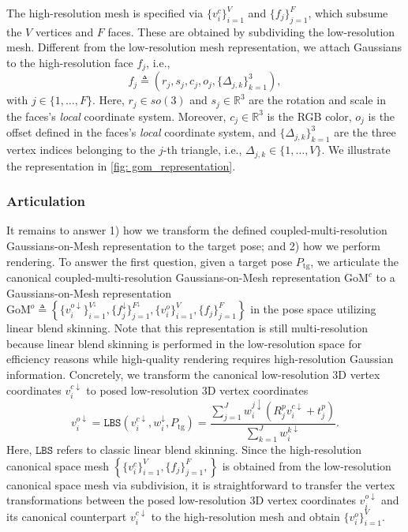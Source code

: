 The high-resolution mesh is specified via $\{v_{i}^c\}_{i=1}^{V}$ and $\{f_{j}\}_{j=1}^{F}$, which subsume the $V$ vertices and $F$ faces. %
These are obtained by subdividing the low-resolution mesh. Different from the low-resolution mesh representation, we attach  Gaussians to the high-resolution face $f_j$, i.e.,
\begin{equation}
    f_j \triangleq (r_j, s_j, c_j, o_j, \{\Delta_{j,k}\}_{k=1}^3), \label{eq: face}
\end{equation}
with $j\in\{1, \dots, F\}$. Here, $r_j \in so(3)$ and $s_j \in \mathbb{R}^3$ are the rotation and scale in the faces's \textit{local} coordinate system. Moreover, $c_j \in \mathbb{R}^3$ is the RGB color, $o_j$ is the offset defined in the faces's \textit{local} coordinate system, and $\{\Delta_{j,k}\}_{k=1}^3$ are the three vertex indices belonging to the $j$-th triangle, i.e., $\Delta_{j,k} \in \{1, \dots, V\}$. We illustrate the representation in \cref{fig: gom_representation}.


\subsubsection{Articulation}
\label{sec: articulation}
It remains to answer 1) how we transform the defined coupled-multi-resolution Gaussians-on-Mesh representation to the target pose; and 2) how we perform rendering. To answer the first question, 
given a target pose $P_\text{tg}$, we articulate the canonical coupled-multi-resolution Gaussians-on-Mesh representation $\text{GoM}^c$ to a  Gaussians-on-Mesh representation $\text{GoM}^o \triangleq \left\{\{v_{i}^{o\downarrow}\}_{i=1}^{V^\downarrow}, \{f_{j}^\downarrow\}_{j=1}^{F^\downarrow}, \{v_{i}^o\}_{i=1}^V, \{f_{j}\}_{j=1}^{F}\right\}$ in the pose space utilizing linear blend skinning. Note that this representation is still multi-resolution because linear blend skinning is performed in the low-resolution space for efficiency reasons while high-quality rendering requires high-resolution Gaussian information. Concretely, we transform the canonical low-resolution 3D vertex coordinates $v_i^{c\downarrow}$ to posed low-resolution 3D vertex coordinates 
\begin{equation}
    v_i^{o\downarrow}=\texttt{LBS} \left( v_{i}^{c\downarrow}, w_{i}^\downarrow, P_\text{tg} \right) = \frac{\sum_{j=1}^J w_{i}^{j\downarrow} (R_j^p v_{i}^{c\downarrow} + t_j^p)}{\sum_{k=1}^{J} w_{i}^{k\downarrow}}. \label{eq: lbs}
\end{equation}
Here, $\texttt{LBS}$ refers to classic linear blend skinning. %
Since the high-resolution canonical space mesh $\left\{\{v_{i}^c\}_{i=1}^{V}, \{f_{j}\}_{j=1}^{F}, \right\}$ is obtained from the low-resolution canonical space mesh via subdivision, it is straightforward to transfer the vertex transformations between the posed low-resolution 3D vertex coordinates $v_i^{o\downarrow}$ and its canonical counterpart $v_i^{c\downarrow}$ to the high-resolution mesh and obtain $\{v_{i}^o\}_{i=1}^{V}$.

